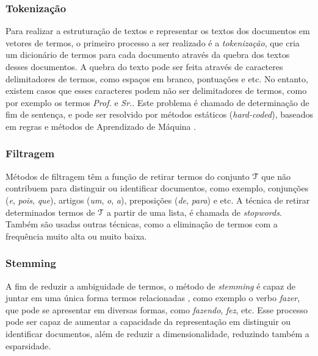 \documentclass[normaltoc, espacoumemeio, pnumromarab,ruledheader]{abnt}
\begin{document}
\subsubsection{Tokenização}

Para realizar a estruturação de textos e representar os textos dos documentos em vetores de termos, o primeiro processo a ser realizado é a \textit{tokenização}, que cria um dicionário de termos para cada documento através da quebra dos textos desses documentos.
A quebra do texto pode ser feita através de caracteres delimitadores de termos, como espaços em branco, pontuações e etc. No entanto, existem casos que esses caracteres podem não ser delimitadores de termos, como por exemplo os termos \textit{Prof.} e \textit{Sr.}.
Este problema é chamado de determinação de fim de sentença, e pode ser resolvido por métodos estáticos (\textit{hard-coded}), baseados em regras e métodos de Aprendizado de Máquina \cite{Weiss2010}.

\subsubsection{Filtragem}

Métodos de filtragem têm a função de retirar termos do conjunto ${\cal T}$ que não contribuem para distinguir ou identificar documentos, como exemplo, conjunções (\textit{e}, \textit{pois}, \textit{que}), artigos (\textit{um}, \textit{o}, \textit{a}), preposições (\textit{de}, \textit{para}) e etc.
A técnica de retirar determinados termos de ${\cal T}$ a partir de uma lista, é chamada de \textit{stopwords}.
Também são usadas outras técnicas, como a eliminação de termos com a frequência muito alta ou muito baixa.


\subsubsection{Stemming}

A fim de reduzir a ambiguidade de termos, o método de \textit{stemming} é capaz de juntar em uma única forma termos relacionadas \cite{Miner2012}, como exemplo o verbo \textit{fazer}, que pode se apresentar em diversas formas, como \textit{fazendo}, \textit{fez}, etc. Esse processo pode ser capaz de aumentar a capacidade da representação em distinguir ou identificar documentos, além de reduzir a dimensionalidade, reduzindo também a esparsidade.
\end{document}

